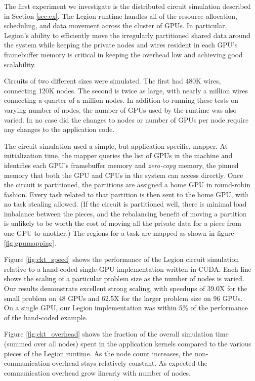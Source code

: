 The first experiment we investigate is the distributed circuit simulation described in 
Section \ref{sec:ex}.  The Legion runtime handles all of the resource allocation, 
scheduling, and data movement across the cluster of GPUs.  In particular,  
Legion's ability to efficiently move the irregularly partitioned
shared data around the system while keeping the private nodes and wires resident in
each GPU's framebuffer memory is critical in keeping the overhead low and achieving 
good scalability.

Circuits of two different sizes were simulated.  The first had 480K wires, connecting
120K nodes.  The second is twice as large, with nearly a million wires connecting a
quarter of a million nodes.  In addition to running these tests on varying number of
nodes, the number of GPUs used by the runtime was also varied.  In no case did the 
changes to nodes or number of GPUs per node require any changes to the application code.

The circuit simulation used a simple, but application-specific, mapper.  At initialization
time, the mapper queries the list of GPUs in the machine and identifies each GPU's
framebuffer memory and {\em zero-copy} memory, the pinned memory that both the GPU and
CPUs in the system can access directly.  Once the circuit is partitioned, the partitions
are assigned a home GPU in round-robin fashion.  Every task related to that partition is
then sent to the home GPU, with no task stealing allowed.  (If the circuit is partitioned well,
there is minimal load imbalance between the pieces, and the rebalancing benefit of 
moving a partition is unlikely to be worth the cost of moving all the 
private data for a piece from one GPU to another.)  The regions for a task are mapped as 
shown in figure \ref{fig:gpumapping}.

Figure \ref{fig:ckt_speed} shows the performance of the Legion circuit simulation relative
to a hand-coded single-GPU implementation written in CUDA.  Each line shows the scaling of
a particular problem size as the number of nodes is varied.  Our results demonstrate
excellent strong scaling, with speedups of 39.0X for the small problem on 48 GPUs and 
62.5X for the larger problem size on 96 GPUs.  On a single GPU, our Legion implementation
was within 5\% of the performance of the hand-coded example.

Figure \ref{fig:ckt_overhead} shows the fraction of the overall simulation time (summed over
all nodes) spent in the application kernels compared to the various pieces of the Legion
runtime.  As the node count increases, the non-communication overhead stays relatively constant.
As expected the communication overhead grow linearly with number of nodes.

